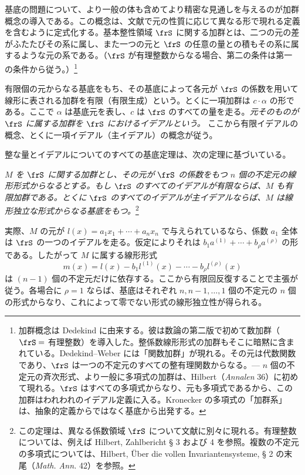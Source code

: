 \documentclass[11pt]{article}
\begin{document}
基底の問題について、より一般の体も含めてより精密な見通しを与えるのが加群概念の導入である。この概念は、文献で元の性質に応じて異なる形で現れる定義を含むように定式化する。基本整性領域 \(\frS\) に関する加群とは、二つの元の差がふたたびその系に属し、また一つの元と \(\frS\) の任意の量との積もその系に属するような元の系である。（\(\frS\) が有理整数からなる場合、第二の条件は第一の条件から従う。）\footnote{加群概念は Dedekind に由来する。彼は数論の第二版で初めて数加群（\(\frS=\) 有理整数）を導入した。整係数線形形式の加群もそこに暗黙に含まれている。Dedekind--Weber には「関数加群」が現れる。その元は代数関数であり、\(\frS\) は一つの不定元のすべての整有理関数からなる。--- \(n\) 個の不定元の斉次形式、より一般に多項式の加群は、Hilbert（\emph{Annalen} 36）に初めて現れる。\(\frS\) はすべての多項式からなり、元も多項式であるから、この加群はわれわれのイデアル定義に入る。Kronecker の多項式の「加群系」は、抽象的定義からではなく基底から出発する。}

有限個の元からなる基底をもち、その基底によって各元が \(\frS\) の係数を用いて線形に表される加群を有限（有限生成）という。とくに一項加群は \(c\cdot\alpha\) の形である。ここで \(\alpha\) は基底元を表し、\(c\) は \(\frS\) のすべての量を走る。\emph{元そのものが \(\frS\) に属する加群を \(\frS\) におけるイデアルという。} ここから有限イデアルの概念、とくに一項イデアル（主イデアル）の概念が従う。

整な量とイデアルについてのすべての基底定理は、次の定理に基づいている。

\emph{\(M\) を \(\frS\) に関する加群とし、その元が \(\frS\) の係数をもつ \(n\) 個の不定元の線形形式からなるとする。もし \(\frS\) のすべてのイデアルが有限ならば、\(M\) も有限加群である。とくに \(\frS\) のすべてのイデアルが主イデアルならば、\(M\) は線形独立な形式からなる基底をもつ。}\footnote{この定理は、異なる係数領域 \(\frS\) について文献に別々に現れる。有理整数については、例えば Hilbert, Zahlbericht § 3 および 4 を参照。複数の不定元の多項式については、Hilbert, Über die vollen Invariantensysteme, § 2 の末尾（\emph{Math. Ann.} 42）を参照。}

実際、\(M\) の元が \(l(x)=a_1x_1+\cdots+a_nx_n\) で与えられているなら、係数 \(a_1\) 全体は \(\frS\) の一つのイデアルを走る。仮定によりそれは \(b_1a^{(1)}+\cdots+b_\rho a^{(\rho)}\) の形である。したがって \(M\) に属する線形形式
\[
m(x)=l(x)-b_1l^{(1)}(x)-\cdots-b_\rho l^{(\rho)}(x)
\]
は \((n-1)\) 個の不定元だけに依存する。ここから有限回反復することで主張が従う。各場合に \(\rho=1\) ならば、基底はそれぞれ \(n,n-1,\ldots,1\) 個の不定元の \(n\) 個の形式からなり、これによって零でない形式の線形独立性が得られる。
\end{document}

